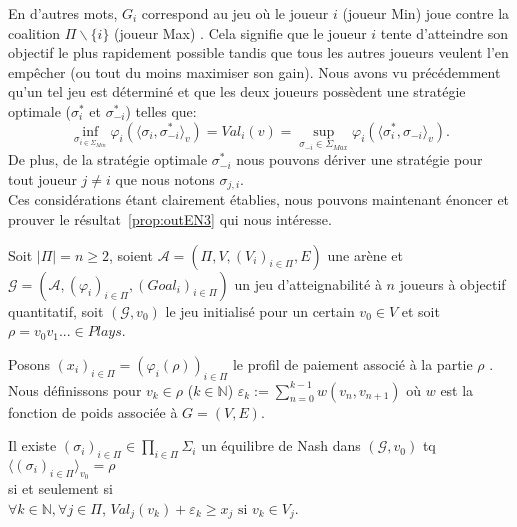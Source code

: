 En d'autres mots, $G_i$ correspond au jeu où le joueur $i$ (joueur Min) joue contre la coalition $\Pi\backslash\{ i \}$ (joueur Max) . Cela signifie que le joueur $i$ tente d'atteindre son objectif le plus rapidement possible tandis que tous les autres joueurs veulent l'en empêcher (ou tout du moins maximiser son gain). Nous avons vu précédemment qu'un tel jeu est déterminé et que les deux joueurs possèdent une stratégie optimale ($\sigma^*_i$ et $\sigma^*_{-i}$) telles que:
$$ \inf_{\sigma _{i\in \Sigma _{Min}}} \varphi_i(\langle \sigma_i,\sigma^*_{-i}\rangle_v)= Val_i(v) = \sup _{\sigma_{-i}\in \Sigma_{Max}} \varphi_i(\langle \sigma^*_i, \sigma_{-i}\rangle_v).$$ De plus, de la stratégie optimale $\sigma^*_{-i}$ nous pouvons dériver une stratégie pour tout joueur $j \neq i$ que nous notons $\sigma_{j,i}$.\\

Ces considérations étant clairement établies, nous pouvons maintenant énoncer et prouver le résultat~\ref{prop:outEN3} qui nous intéresse.
\begin{propriete}
	\label{prop:outEN3}
	Soit $|\Pi| = n \geq 2$,
	soient $\mathcal{A} = (\Pi, V, (V_{i})_{i\in\Pi}, E)$ une arène et $\mathcal{G} = (\mathcal{A}, (\varphi _{i})_{i\in\Pi}, (Goal_{i})_{i\in\Pi})$ un jeu d'atteignabilité à $n$ joueurs à objectif quantitatif, soit $(\mathcal{G}, v_{0})$ le jeu initialisé pour un certain $v_{0} \in V $ et soit $\rho = v_{0}v_{1}... \in Plays$. 
	
	Posons $(x_{i})_{i\in\Pi} = (\varphi _{i}(\rho))_{i\in\Pi}$ le profil de paiement associé à la partie $\rho$ . Nous définissons pour $v_{k} \in \rho$ ($k \in \mathbb{N}$)  $\varepsilon _{k} := \sum _{n= 0} ^{k-1} w(v_{n},v_{n+1})$ où $w$ est la fonction de poids associée à $G = (V,E)$.
	
	\begin{center}Il existe $ (\sigma _{i})_{i\in\Pi} \in \prod_{i\in\Pi} \Sigma _{i}$ un équilibre de Nash dans $(\mathcal{G},v_{0})$ tq $\langle (\sigma _{i})_{i \in \Pi}\rangle_{v_0} = \rho$\\ $\text{}$\\ si et seulement si\\$\text{}$\\  $ \forall k \in \mathbb{N}, \forall j \in \Pi$, $Val_{j}(v_{k}) + \varepsilon _{k} \geq x_j \text{  si } v_{k} \in V_{j}$.\end{center}
	
\end{propriete}

\setcounter{equation}{0}

